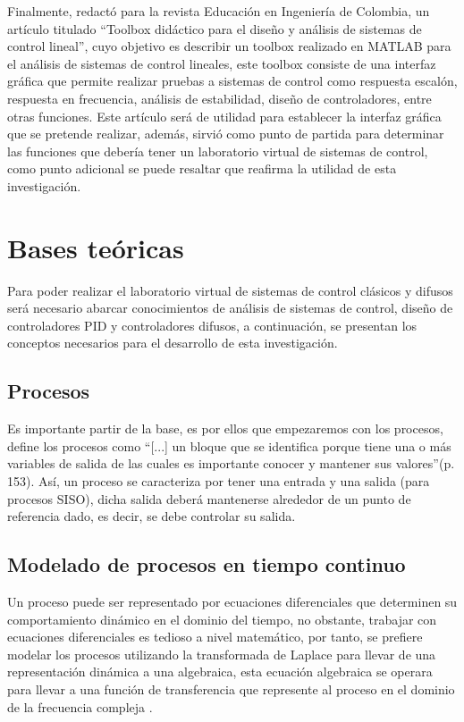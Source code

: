	Finalmente, \textcite{cadavid2009toolbox} redactó para la revista Educación en Ingeniería de Colombia, un artículo titulado \enquote{Toolbox didáctico para el diseño y análisis de sistemas de control lineal}, cuyo objetivo es describir un toolbox realizado en MATLAB para el análisis de sistemas de control lineales, este toolbox consiste de una interfaz gráfica que permite realizar pruebas a sistemas de control como respuesta escalón, respuesta en frecuencia, análisis de estabilidad, diseño de controladores, entre otras funciones. Este artículo será de utilidad para establecer la interfaz gráfica que se pretende realizar, además, sirvió como punto de partida para determinar las funciones que debería tener un laboratorio virtual de sistemas de control, como punto adicional se puede resaltar que reafirma la utilidad de esta investigación. 
	
\section{Bases teóricas}
	
	Para poder realizar el laboratorio virtual de sistemas de control clásicos y difusos será necesario abarcar conocimientos de análisis de sistemas de control, diseño de controladores PID y controladores difusos, a continuación, se presentan los conceptos necesarios para el desarrollo de esta investigación.
	
	\subsection{Procesos}
		
		Es importante partir de la base, es por ellos que empezaremos con los procesos, \textcite{sanchez2003control} define los procesos como \enquote{[...] un bloque que se identifica porque tiene una o más variables de salida de las cuales es importante conocer y mantener sus valores}(p.$\,$153). Así, un proceso se caracteriza por tener una entrada y una salida (para procesos SISO), dicha salida deberá mantenerse alrededor de un punto de referencia dado, es decir, se debe controlar su salida.
	
	\subsection{Modelado de procesos en tiempo continuo}
	
		Un proceso puede ser representado por ecuaciones diferenciales que determinen su comportamiento dinámico en el dominio del tiempo, no obstante, trabajar con ecuaciones diferenciales es tedioso a nivel matemático, por tanto, se prefiere modelar los procesos utilizando la transformada de Laplace para llevar de una representación dinámica a una algebraica, esta ecuación algebraica se operara para llevar a una función de transferencia que represente al proceso en el dominio de la frecuencia compleja \Parencite{smith1985principles}.
	
